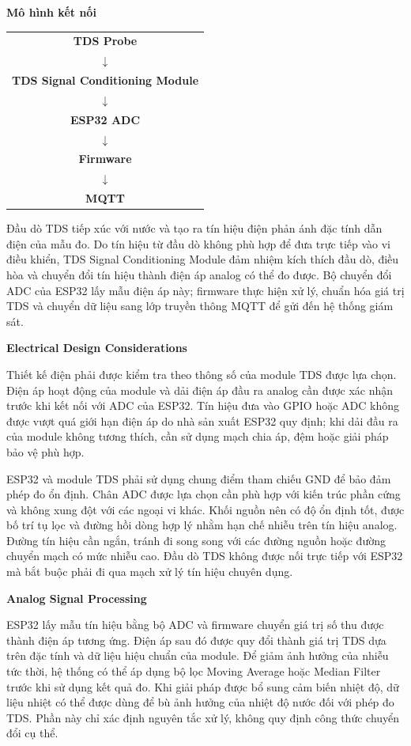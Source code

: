 \textbf{Mô hình kết nối}

\begin{center}
\begin{tabular}{c}
\textbf{TDS Probe} \\
$\downarrow$ \\
\textbf{TDS Signal Conditioning Module} \\
$\downarrow$ \\
\textbf{ESP32 ADC} \\
$\downarrow$ \\
\textbf{Firmware} \\
$\downarrow$ \\
\textbf{MQTT}
\end{tabular}
\end{center}

Đầu dò TDS tiếp xúc với nước và tạo ra tín hiệu điện phản ánh đặc tính dẫn điện của mẫu đo. Do tín hiệu từ đầu dò không phù hợp để đưa trực tiếp vào vi điều khiển, TDS Signal Conditioning Module đảm nhiệm kích thích đầu dò, điều hòa và chuyển đổi tín hiệu thành điện áp analog có thể đo được. Bộ chuyển đổi ADC của ESP32 lấy mẫu điện áp này; firmware thực hiện xử lý, chuẩn hóa giá trị TDS và chuyển dữ liệu sang lớp truyền thông MQTT để gửi đến hệ thống giám sát.

\textbf{Electrical Design Considerations}

Thiết kế điện phải được kiểm tra theo thông số của module TDS được lựa chọn. Điện áp hoạt động của module và dải điện áp đầu ra analog cần được xác nhận trước khi kết nối với ADC của ESP32. Tín hiệu đưa vào GPIO hoặc ADC không được vượt quá giới hạn điện áp do nhà sản xuất ESP32 quy định; khi dải đầu ra của module không tương thích, cần sử dụng mạch chia áp, đệm hoặc giải pháp bảo vệ phù hợp.

ESP32 và module TDS phải sử dụng chung điểm tham chiếu GND để bảo đảm phép đo ổn định. Chân ADC được lựa chọn cần phù hợp với kiến trúc phần cứng và không xung đột với các ngoại vi khác. Khối nguồn nên có độ ổn định tốt, được bố trí tụ lọc và đường hồi dòng hợp lý nhằm hạn chế nhiễu trên tín hiệu analog. Đường tín hiệu cần ngắn, tránh đi song song với các đường nguồn hoặc đường chuyển mạch có mức nhiễu cao. Đầu dò TDS không được nối trực tiếp với ESP32 mà bắt buộc phải đi qua mạch xử lý tín hiệu chuyên dụng.

\textbf{Analog Signal Processing}

ESP32 lấy mẫu tín hiệu bằng bộ ADC và firmware chuyển giá trị số thu được thành điện áp tương ứng. Điện áp sau đó được quy đổi thành giá trị TDS dựa trên đặc tính và dữ liệu hiệu chuẩn của module. Để giảm ảnh hưởng của nhiễu tức thời, hệ thống có thể áp dụng bộ lọc Moving Average hoặc Median Filter trước khi sử dụng kết quả đo. Khi giải pháp được bổ sung cảm biến nhiệt độ, dữ liệu nhiệt có thể được dùng để bù ảnh hưởng của nhiệt độ nước đối với phép đo TDS. Phần này chỉ xác định nguyên tắc xử lý, không quy định công thức chuyển đổi cụ thể.


